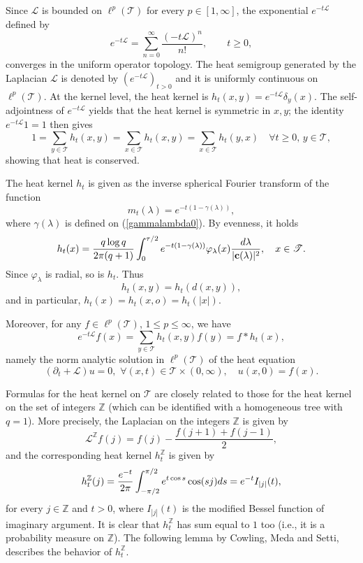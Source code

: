 \documentclass[11pt,a4paper,reqno]{amsart}
\renewcommand\mathcal{\mathscr}
\theoremstyle{plain}
\theoremstyle{remark}
\theoremstyle{definition}
\theoremstyle{remark}
\numberwithin{equation}{section}
\def\int{\intop\nolimits}
\begin{document}
Since $\mathcal L$ is bounded on $\ell^p(\mathcal T)$ for every
$p\in[1,\infty]$, the exponential $e^{-t\mathcal L}$ defined by
\[
e^{-t\mathcal L}
=
\sum_{n=0}^\infty\frac{(-t\mathcal L)^n}{n!},
\qquad t\geq0,
\]
converges in the uniform operator topology.
The heat semigroup generated by the Laplacian $\mathcal{L}$ is denoted by $(e^{-t\mathcal{L}})_{t> 0}$ and it is uniformly
continuous on $\ell^p(\mathcal{T})$. At the kernel level, the heat kernel is $h_t(x,y)=e^{-t\mathcal{L}}\delta_y(x)$. 
The self-adjointness of $e^{-t\mathcal{L}}$ yields that the heat kernel is symmetric in $x,y$; the identity $e^{-t\mathcal{L}}1=1$ then gives
\[
1=\sum_{y\in \mathcal{T}}h_t(x,y)=\sum_{x\in \mathcal{T}}h_t(x,y)= \sum_{x\in \mathcal{T}}h_t(y,x) \quad \forall t\geq 0, \, y\in \mathcal{T},
\]
showing that heat is conserved.

	The heat kernel $h_t$ is given as the inverse spherical Fourier transform of the function 
	\begin{equation*}
	m_t(\lambda)=e^{-t(1-\gamma(\lambda))},
	\end{equation*} where $\gamma(\lambda)$ is defined on (\ref{gammalambda0}). By evenness, it holds 
	\begin{equation}\label{inversionT} 
		h_t(x)=\frac{q\log q}{2\pi(q+1)}\int_{0}^{\tau /2}e^{-t(1-\gamma(\lambda))}\varphi_{\lambda}(x)\frac{d \lambda}{|\textbf{c}(\lambda)|^2}, \quad  x\in \mathcal{T}.
	\end{equation}
Since $\varphi_{\lambda}$ is radial, so is $h_t$. Thus
\[
h_t(x,y)=h_t(d(x,y)),
\]
and in particular, $h_t(x)=h_t(x,o)=h_t(|x|)$.

Moreover, for any $f\in \ell^p(\mathcal{T})$, $1\leq p \leq \infty$, we have
$$e^{-t\mathcal{L}}f(x)=\sum_{y\in \mathcal{T}}h_t(x,y)f(y)=f\ast h_t(x),$$
namely the norm analytic solution in $\ell^p(\mathcal{T})$ of the heat equation $$(\partial_t+\mathcal{L})u=0, \,\, \forall (x,t)\in \mathcal{T}\times (0, \infty), \quad u(x,0)=f(x).$$
	
	Formulas for the heat kernel on $\mathcal{T}$ are closely related to those for the heat kernel on the set of integers $\mathbb{Z}$ (which can be identified with a homogeneous tree with $q=1$). More precisely, the Laplacian on the integers $\mathbb{Z}$ is given by 
	\[
	\mathcal{L}^{\mathbb{Z}}f(j)=f(j)-\frac{f(j+1)+f(j-1)}{2}, 
	\]
	and the corresponding heat kernel $h_t^{\mathbb{Z}}$ is given by
	\begin{align*}
		h_t^{\mathbb{Z}}(j)=\frac{e^{-t}}{2\pi}\int_{-\pi /2}^{\pi/2}e^{t\cos s}\cos (sj)ds=e^{-t}I_{|j|}(t), 
	\end{align*}
	for every $j\in \mathbb{Z}$ and $t>0$, where $I_{|j|}(t)$ is the modified Bessel function of imaginary
argument. It is clear that $h_t^{\mathbb{Z}}$ has sum equal to $1$ too (i.e., it is a probability measure on $\mathbb{Z}$). The following lemma by Cowling, Meda and Setti, describes the behavior of $h_t^{\mathbb{Z}}$.
	
\end{document}
